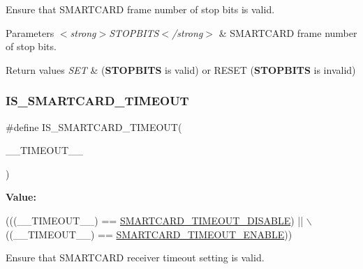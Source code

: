 Ensure that S\+M\+A\+R\+T\+C\+A\+RD frame number of stop bits is valid. 


\begin{DoxyParams}{Parameters}
{\em $<$strong$>$\+S\+T\+O\+P\+B\+I\+T\+S$<$/strong$>$} & S\+M\+A\+R\+T\+C\+A\+RD frame number of stop bits. \\
\hline
\end{DoxyParams}

\begin{DoxyRetVals}{Return values}
{\em S\+ET} & ({\bfseries S\+T\+O\+P\+B\+I\+TS} is valid) or R\+E\+S\+ET ({\bfseries S\+T\+O\+P\+B\+I\+TS} is invalid) \\
\hline
\end{DoxyRetVals}
\mbox{\label{group___s_m_a_r_t_c_a_r_d___private___macros_ga44dd8f160b80c1546c0195387091504b}} 
\subsubsection{\texorpdfstring{I\+S\+\_\+\+S\+M\+A\+R\+T\+C\+A\+R\+D\+\_\+\+T\+I\+M\+E\+O\+UT}{IS\_SMARTCARD\_TIMEOUT}}
{\footnotesize\ttfamily \#define I\+S\+\_\+\+S\+M\+A\+R\+T\+C\+A\+R\+D\+\_\+\+T\+I\+M\+E\+O\+UT(\begin{DoxyParamCaption}\item[{}]{\+\_\+\+\_\+\+T\+I\+M\+E\+O\+U\+T\+\_\+\+\_\+ }\end{DoxyParamCaption})}

{\bfseries Value\+:}
\begin{DoxyCode}
(((\_\_TIMEOUT\_\_) == \hyperlink{group___s_m_a_r_t_c_a_r_d___timeout___enable_ga0ba20486fc3bcc8e5af29c93a6a8cf59}{SMARTCARD\_TIMEOUT\_DISABLE}) || \(\backslash\)
                                           ((\_\_TIMEOUT\_\_) == 
      \hyperlink{group___s_m_a_r_t_c_a_r_d___timeout___enable_gafe265eb057a328f79f45394e1d5f6655}{SMARTCARD\_TIMEOUT\_ENABLE}))
\end{DoxyCode}


Ensure that S\+M\+A\+R\+T\+C\+A\+RD receiver timeout setting is valid. 



